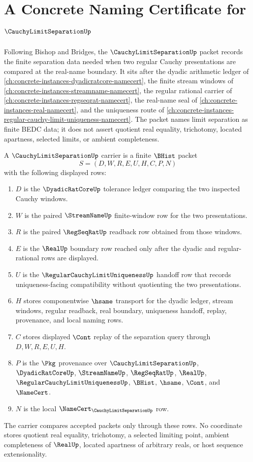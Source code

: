 \chapter{A Concrete Naming Certificate for $\CauchyLimitSeparationUp$}
\label{ch:concrete-instances-cauchy-limit-separation-namecert}

Following Bishop and Bridges, the $\CauchyLimitSeparationUp$ packet records the finite separation data needed when two regular Cauchy presentations are compared at the real-name boundary. It sits after the dyadic arithmetic ledger of \autoref{ch:concrete-instances-dyadicratcore-namecert}, the finite stream windows of \autoref{ch:concrete-instances-streamname-namecert}, the regular rational carrier of \autoref{ch:concrete-instances-regseqrat-namecert}, the real-name seal of \autoref{ch:concrete-instances-real-namecert}, and the uniqueness route of \autoref{ch:concrete-instances-regular-cauchy-limit-uniqueness-namecert}. The packet names limit separation as finite BEDC data; it does not assert quotient real equality, trichotomy, located apartness, selected limits, or ambient completeness.

\begin{definition}
\label{def:cauchy-limit-separation-carrier}
A $\CauchyLimitSeparationUp$ carrier is a finite $\BHist$ packet
$$
S=(D,W,R,E,U,H,C,P,N)
$$
with the following displayed rows:
\begin{enumerate}
\item $D$ is the $\DyadicRatCoreUp$ tolerance ledger comparing the two inspected Cauchy windows.
\item $W$ is the paired $\StreamNameUp$ finite-window row for the two presentations.
\item $R$ is the paired $\RegSeqRatUp$ readback row obtained from those windows.
\item $E$ is the $\RealUp$ boundary row reached only after the dyadic and regular-rational rows are displayed.
\item $U$ is the $\RegularCauchyLimitUniquenessUp$ handoff row that records uniqueness-facing compatibility without quotienting the two presentations.
\item $H$ stores componentwise $\hsame$ transport for the dyadic ledger, stream windows, regular readback, real boundary, uniqueness handoff, replay, provenance, and local naming rows.
\item $C$ stores displayed $\Cont$ replay of the separation query through $D,W,R,E,U,H$.
\item $P$ is the $\Pkg$ provenance over $\CauchyLimitSeparationUp$, $\DyadicRatCoreUp$, $\StreamNameUp$, $\RegSeqRatUp$, $\RealUp$, $\RegularCauchyLimitUniquenessUp$, $\BHist$, $\hsame$, $\Cont$, and $\NameCert$.
\item $N$ is the local $\NameCert_{\CauchyLimitSeparationUp}$ row.
\end{enumerate}
The carrier compares accepted packets only through these rows. No coordinate stores quotient real equality, trichotomy, a selected limiting point, ambient completeness of $\RealUp$, located apartness of arbitrary reals, or host sequence extensionality.
\end{definition}

